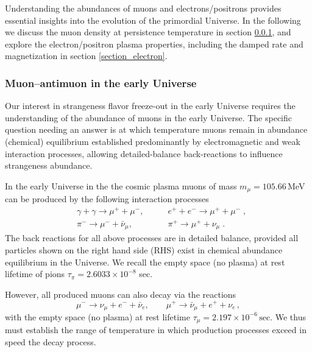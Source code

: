 Understanding the abundances of muons and electrons/positrons provides essential insights into the evolution of the primordial Universe.  In the following we discuss the muon density at persistence temperature in section \ref{section_muon}, and explore the electron/positron plasma properties, including the damped rate and magnetization in section \ref{section_electron}.


\subsubsection{Muon–antimuon in the early Universe}\label{section_muon}

Our interest in strangeness flavor freeze-out in the early Universe requires the understanding of the abundance of muons in the early Universe. The specific question needing an answer is at which temperature muons remain in abundance (chemical) equilibrium established predominantly by electromagnetic and weak interaction processes, allowing detailed-balance back-reactions to influence strangeness abundance.


In the early Universe in the the cosmic plasma muons of mass $m_\mu=105.66$\,MeV can be produced by the following interaction processes
\begin{align} 
&\gamma+\gamma\longrightarrow\mu^++\mu^-,\qquad & e^++e^-\longrightarrow \mu^++\mu^-\;,\\
&\pi^-\longrightarrow\mu^-+\bar{\nu}_\mu,\qquad & \pi^+\longrightarrow\mu^++\nu_\mu\;.
\end{align}
The back reactions for all above processes are in detailed balance, provided all particles shown on the right hand side (RHS) exist in chemical abundance equilibrium in the Universe. We recall the empty space (no plasma) at rest lifetime of pions $\tau_\pi=2.6033\times10^{-8}$ sec. 

However, all produced muons can also decay via the reactions
\begin{equation}
\mu^-\rightarrow\nu_\mu+e^-+\bar{\nu}_e,\qquad \mu^+\rightarrow\bar{\nu}_\mu+e^++\nu_e\,,
\end{equation} 
with the empty space (no plasma) at rest lifetime $\tau_{\mu}=2.197 \times 10^{-6}\,\mathrm{sec}$. We thus must establish the range of temperature in which production processes exceed in speed the decay process.
 

